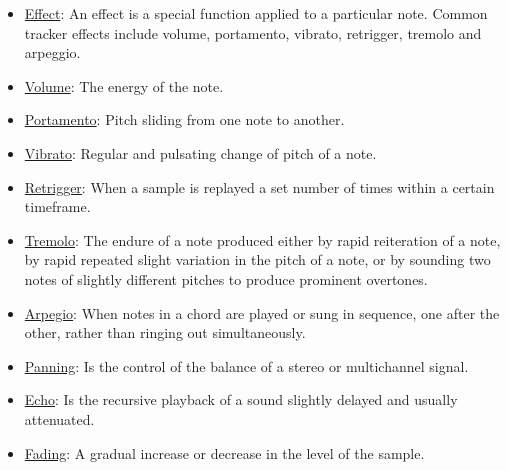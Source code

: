 \begin{itemize}
\item
  \href{http://www.milkytracker.org/docs/MilkyTracker.html#effects}{Effect}:
  An effect is a special function applied to a particular note. Common
  tracker effects include volume, portamento, vibrato, retrigger,
  tremolo and arpeggio.

\item \href{http://en.wikipedia.org/wiki/Loudness}{Volume}: The energy
  of the note.

\item \href{http://en.wikipedia.org/wiki/Portamento}{Portamento}:
  Pitch sliding from one note to another.

\item \href{http://en.wikipedia.org/wiki/Vibrato}{Vibrato}: Regular
  and pulsating change of pitch of a note.

\item \href{http://en.wikipedia.org/wiki/Retrigger}{Retrigger}: When a
  sample is replayed a set number of times within a certain timeframe.

\item \href{http://en.wikipedia.org/wiki/Tremolo}{Tremolo}: The
  endure of a note produced either by rapid reiteration of a
  note, by rapid repeated slight variation in the pitch of a note, or
  by sounding two notes of slightly different pitches to produce
  prominent overtones.

\item \href{http://en.wikipedia.org/wiki/Arpeggio}{Arpegio}: When
  notes in a chord are played or sung in sequence, one after the
  other, rather than ringing out simultaneously.

\item
  \href{http://resources.openmpt.org/tracker_handbook/page/Glossary.htm}{Panning}:
  Is the control of the balance of a stereo or multichannel signal.

\item
  \href{http://milkytracker.org/docs/Vhiiula-TechniquesOfChipping.txt}{Echo}:
  Is the recursive playback of a sound slightly delayed and usually
  attenuated.

\item
  \href{http://en.wikipedia.org/wiki/Fade\_\%28audio\_engineering\%29}{Fading}:
  A gradual increase or decrease in the level of the sample.

\end{itemize}

